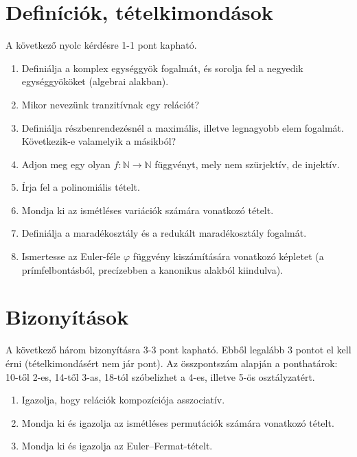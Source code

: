 \documentclass[11pt,a4paper]{article}
\begin{document}
\section{Definíciók, tételkimondások}
A következő nyolc kérdésre 1-1 pont kapható. 
\begin{enumerate}\setlength{\itemsep}{2.2cm}

\item Definiálja a komplex egységgyök fogalmát, és sorolja fel a negyedik egységgyököket (algebrai alakban).
\item Mikor nevezünk tranzitívnak egy relációt?
\item Definiálja részbenrendezésnél a maximális, illetve legnagyobb elem fogalmát. Következik-e valamelyik a másikból?
\item Adjon meg egy olyan $f\colon \mathbb{N}\to\mathbb{N}$ függvényt, mely nem szürjektív, de injektív.

\item Írja fel a polinomiális tételt.
\item Mondja ki az ismétléses variációk számára vonatkozó tételt.
\item Definiálja a maradékosztály és a redukált maradékosztály fogalmát.
\item Ismertesse az Euler-féle $\varphi$ függvény kiszámítására vonatkozó képletet (a prímfelbontásból, precízebben a kanonikus alakból kiindulva).



\end{enumerate}

\newpage
\section{Bizonyítások}
A következő három bizonyításra 3-3 pont kapható. Ebből legalább 3 pontot el kell érni (tételkimondásért nem jár pont).
Az összpontszám alapján a ponthatárok: 10-től 2-es, 14-től 3-as, 18-tól szóbelizhet a 4-es, illetve 5-ös osztályzatért.
\begin{enumerate}

\item Igazolja, hogy relációk kompozíciója asszociatív.
\item Mondja ki és igazolja az ismétléses permutációk számára vonatkozó tételt.
\item Mondja ki és igazolja az Euler--Fermat-tételt.

\end{enumerate}
\end{document}
